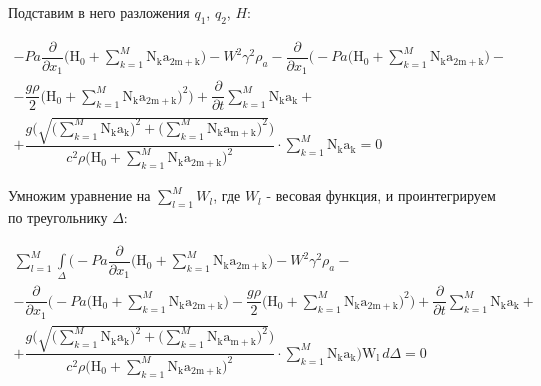 \documentclass[14pt]{extreport}
\begin{document}
Подставим в него разложения $q_1$, $q_2$, $H$:

\begin{multline*}
- Pa \dfrac{\partial}{\partial x_{1}} \bigg(\operatorname{H_{0}} + \sum_{k=1}^{M} \operatorname{N_{k}} \operatorname{a_{2m+k}}\bigg) - W^{2} \gamma^{2} \rho_{a} - \dfrac{\partial}{\partial x_{1}}\bigg(- Pa \bigg(\operatorname{H_{0}} + \sum\limits_{k=1}^{M} \operatorname{N_{k}} \operatorname{a_{2m+k}}\bigg) -\\- \dfrac{g \rho}{2} \bigg(\operatorname{H_{0}} + \sum\limits_{k=1}^{M} \operatorname{N_{k}} \operatorname{a_{2m+k}}\bigg)^{2}\bigg) + \dfrac{\partial}{\partial t} \sum\limits_{k=1}^{M} \operatorname{N_{k}} \operatorname{a_{k}} +\\+ \dfrac{g \bigg(\sqrt{\bigg(\sum\limits_{k=1}^{M} \operatorname{N_{k}} \operatorname{a_{k}}\bigg)^{2} + \bigg(\sum\limits_{k=1}^{M} \operatorname{N_{k}} \operatorname{a_{m+k}}\bigg)^{2}}\bigg)}{c^{2} \rho \bigg(\operatorname{H_{0}} + \sum\limits_{k=1}^{M} \operatorname{N_{k}} \operatorname{a_{2m+k}}\bigg)^{2}} \cdot \sum\limits_{k=1}^{M} \operatorname{N_{k}} \operatorname{a_{k}} = 0
\end{multline*}

Умножим уравнение на $\sum\limits_{l=1}^{M} W_l$, где $W_l$ - весовая функция, и проинтегрируем по треугольнику $\Delta$:

\begin{multline*}
\sum_{l=1}^{M} \int\limits_{\Delta} \bigg(- Pa \dfrac{\partial}{\partial x_{1}}\bigg(\operatorname{H_{0}} + \sum_{k=1}^{M} \operatorname{N_{k}} \operatorname{a_{2m+k}}\bigg) - W^{2} \gamma^{2} \rho_{a} -\\- \dfrac{\partial}{\partial x_{1}}\bigg(- Pa \bigg(\operatorname{H_{0}} + \sum\limits_{k=1}^{M} \operatorname{N_{k}} \operatorname{a_{2m+k}}\bigg) - \dfrac{g \rho}{2} \bigg(\operatorname{H_{0}} + \sum_{k=1}^{M} \operatorname{N_{k}} \operatorname{a_{2m+k}}\bigg)^{2}\bigg) + \dfrac{\partial}{\partial t} \sum\limits_{k=1}^{M} \operatorname{N_{k}} \operatorname{a_{k}} +\\+ \dfrac{g \bigg(\sqrt{\bigg(\sum\limits_{k=1}^{M} \operatorname{N_{k}} \operatorname{a_{k}}\bigg)^{2} + \bigg(\sum\limits_{k=1}^{M} \operatorname{N_{k}} \operatorname{a_{m+k}}\bigg)^{2}}\bigg)}{c^{2} \rho \bigg(\operatorname{H_{0}} + \sum\limits_{k=1}^{M} \operatorname{N_{k}} \operatorname{a_{2m+k}}\bigg)^{2}} \cdot \sum\limits_{k=1}^{M} \operatorname{N_{k}} \operatorname{a_{k}}\bigg) \operatorname{W_{l}}\, d\Delta = 0
\end{multline*}
\end{document}
